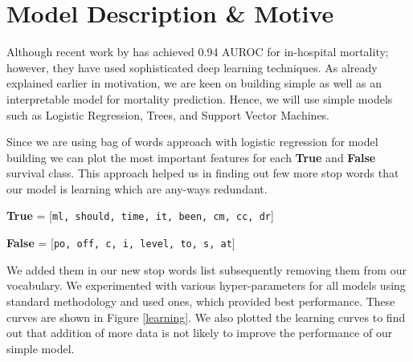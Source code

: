 \documentclass[11pt,a4paper]{article}
\begin{document}
\section{Model Description \& Motive}\label{model}
Although recent work by \citet{rajkomar2018scalable} has achieved  0.94 AUROC for in-hospital mortality; however, they have used sophisticated deep learning techniques. As already explained earlier in motivation, we are keen on building simple as well as an interpretable model for mortality prediction. Hence, we will use simple models such as Logistic Regression, Trees, and Support Vector Machines.

Since we are using bag of words approach with logistic regression for model building we can plot the most important features for each \textbf{True} and \textbf{False} survival class.
This approach helped us in finding out few more stop words that our model is learning which are any-ways redundant. 

\textbf{True} = [\texttt{ml, should, time, it, been, cm, cc, dr}]

\textbf{False} = [\texttt{po, off, c, i, level, to, s, at}]

We added them in our new stop words list subsequently removing them from our vocabulary.  We experimented with various hyper-parameters for all models using standard methodology and used ones, which provided best performance. These curves are shown in Figure \ref{learning}.
We also plotted the learning curves to find out that addition of more data is not likely to improve the performance of our simple model.  
\end{document}
